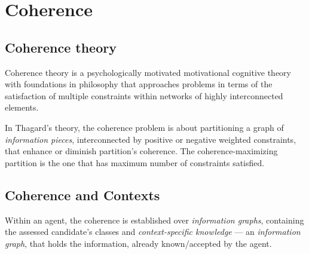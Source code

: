 





%

\def\coh{\mathrm{coh}}
\def\cohi{\mathrm{\widetilde{coh}}}


\section{Coherence}

\subsection{Coherence theory}

Coherence theory is a psychologically motivated motivational cognitive theory with
foundations in philosophy that approaches problems in terms of the satisfaction
of multiple constraints within networks of highly interconnected elements.

In Thagard’s theory, the coherence problem is about partitioning a graph of
\emph{information pieces}, interconnected by positive or negative weighted
constraints, that enhance or diminish partition's coherence.
The coherence-maximizing partition is the one that has maximum number of constraints
satisfied.




\subsection{Coherence and Contexts}
\label{section:coherence}


Within an agent, the coherence is established over \emph{information graphs},
containing the assessed candidate's classes and \emph{context-specific
  knowledge} --- an \emph{information graph}, that holds the information,
already known/accepted by the agent.

